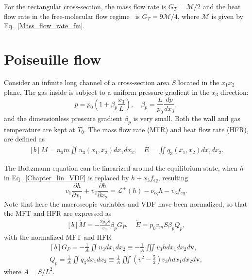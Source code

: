 For the rectangular cross-section, the mass flow rate is $G_T=\mathcal{M}/{2}$ and the heat flow rate in the free-molecular flow regime~\cite{loyalka1976} is $G_T={9}\mathcal{M}/4$, where $\mathcal{M}$ is given by Eq.~\eqref{Mass_flow_rate_fm}. 



%

\section{Poiseuille flow }
\label{FSM_linear_Poiseuille}

Consider an infinite long channel of a cross-section area $S$ located in the $x_1x_2$ plane. The gas inside is subject to a uniform pressure gradient in the $x_3$ direction:
\begin{equation}
p=p_0\left(1+\beta_p{}\frac{x_3}{L}\right), \quad
\beta_p=\frac{L}{p_0}\frac{dp}{dx_3},
\end{equation}
and the dimensionless pressure gradient $\beta_p$ is very small. Both the wall and gas temperature are kept at $T_0$. The mass flow rate (MFR) and heat flow rate (HFR), are defined as
\begin{equation}\label{MFR_HFR}
\begin{aligned}[b]
\dot{M}=n_0m\iint {}u_3(x_1,x_2)dx_1dx_2,\quad
\dot{E}=\iint       q_3(x_1,x_2)dx_1dx_2.
\end{aligned}
\end{equation}

The Boltzmann equation can be linearized around the equilibrium state, when $h$ in Eq.~\eqref{Chapter_lin_VDF} is replaced by $h+x_3f_{eq}$, resulting 
\begin{equation}\label{poiseuille_tube}
v_1\frac{\partial h}{\partial x_1}+v_2\frac{\partial h}{\partial x_2}=\mathcal{L}^+(h)-\nu_{eq}{h}-{v_3}f_{eq}.
\end{equation}
Note that here the macroscopic variables and VDF have been normalized, so that the MFT and HFR are expressed as
\begin{equation}\label{normalized_MFR}
\begin{aligned}[b]
\dot{M}=-\frac{2p_0S}{v_m}\beta_pG_P,\quad
\dot{E}=p_0v_mS\beta_p{}Q_p,
\end{aligned}
\end{equation}
with the normalized MFT and HFR
\begin{equation}
\begin{aligned}[b]
G_P=-\frac{1}{A}\iint {u_3}dx_1dx_2\equiv -\frac{1}{A}\iiint {v_3h}dx_1dx_2d\bm{v}, \\  
Q_p=\frac{1}{A}\iint {q_3}dx_1dx_2\equiv
\frac{1}{A}\iiint {\left({v}^2-\frac{5}{2}\right)v_3}hdx_1dx_2d\bm{v}, 
\end{aligned}
\end{equation}
where $A=S/L^2$. 





